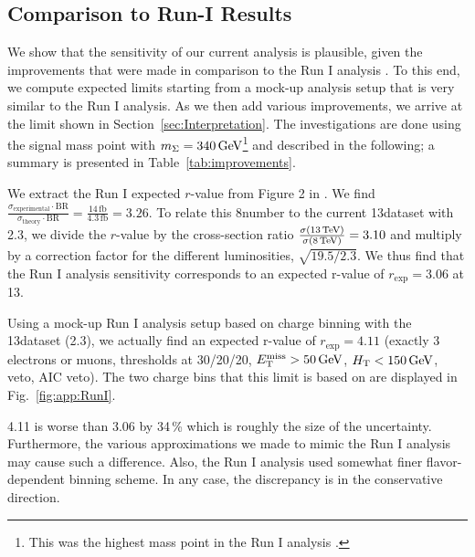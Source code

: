 \subsection{Comparison to Run-I Results}
We show that the sensitivity of our current analysis is plausible, given the improvements that were made in comparison to the Run I analysis \cite{CMS-PAS-EXO-14-001}. To this end, we compute expected limits starting from a mock-up analysis setup that is very similar to the Run I analysis. As we then add various improvements, we arrive at the limit shown in Section~\ref{sec:Interpretation}. The investigations are done using the signal mass point with $m_\Sigma = 340\,\text{Ge\hspace{-.08em}V}$\footnote{This was the highest mass point in the Run I analysis \cite{CMS-PAS-EXO-14-001}.} and described in the following; a summary is presented in Table~\ref{tab:improvements}.

We extract the Run I expected $r$-value from Figure 2 in \cite{CMS-PAS-EXO-14-001}. We find $\frac{\sigma_\textrm{experimental} \cdot \textrm{BR}}{\sigma_\textrm{theory} \cdot \textrm{BR}} = \frac{14\,\textrm{fb}}{4.3\,\textrm{fb}} = 3.26$. To relate this 8\TeV number to the current 13\TeV dataset with 2.3\fbinv, we divide the $r$-value by the cross-section ratio $\frac{\sigma(13\,\text{Te\hspace{-.08em}V})}{\sigma(8\,\text{Te\hspace{-.08em}V})} = 3.10$ and multiply by a correction factor for the different luminosities, $\sqrt{19.5/2.3}$. We thus find that the Run I analysis sensitivity corresponds to an expected r-value of $r_\textrm{exp} = 3.06$ at 13\TeV.

Using a mock-up Run I analysis setup based on charge binning with the 13\TeV dataset (2.3\fbinv), we actually find an expected r-value of $r_\textrm{exp} = 4.11$ (exactly 3 electrons or muons, \pt thresholds at 30/20/20\GeV, $E_{\mathrm{T}}^{\text{miss}} > 50\,\text{Ge\hspace{-.08em}V}$, $H_{\mathrm{T}} < 150\,\text{Ge\hspace{-.08em}V}$, \Z veto, AIC veto). The two charge bins that this limit is based on are displayed in Fig.~\ref{fig:app:RunI}.

4.11 is worse than 3.06 by 34\,\% which is roughly the size of the uncertainty. Furthermore, the various approximations we made to mimic the Run I analysis may cause such a difference. Also, the Run I analysis used somewhat finer flavor-dependent binning scheme. In any case, the discrepancy is in the conservative direction.

